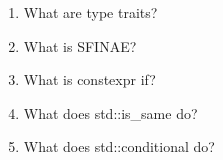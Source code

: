 \begin{enumerate}
\item
What are type traits?

\item
What is SFINAE?

\item
What is constexpr if?

\item
What does std::is\_same do?

\item
What does std::conditional do?
\end{enumerate}